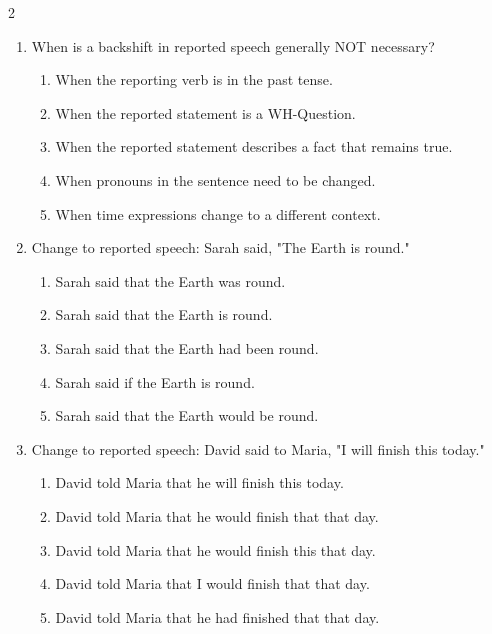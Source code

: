 \documentclass[10pt,a4paper]{article}
\begin{document}
\begin{multicols}{2}
\begin{enumerate}
    \item When is a backshift in reported speech generally NOT necessary?
    \begin{enumerate}
      \item When the reporting verb is in the past tense.
      \item When the reported statement is a WH-Question.
      \item When the reported statement describes a fact that remains true.
      \item When pronouns in the sentence need to be changed.
      \item When time expressions change to a different context.
    \end{enumerate}

    \item Change to reported speech: Sarah said, "The Earth is round."
    \begin{enumerate}
      \item Sarah said that the Earth was round.
      \item Sarah said that the Earth is round.
      \item Sarah said that the Earth had been round.
      \item Sarah said if the Earth is round.
      \item Sarah said that the Earth would be round.
    \end{enumerate}

    \item Change to reported speech: David said to Maria, "I will finish this today."
    \begin{enumerate}
      \item David told Maria that he will finish this today.
      \item David told Maria that he would finish that that day.
      \item David told Maria that he would finish this that day.
      \item David told Maria that I would finish that that day.
      \item David told Maria that he had finished that that day.
    \end{enumerate}

  \end{enumerate}
\end{multicols}
\end{document}
